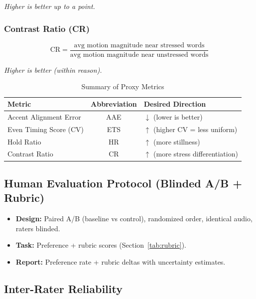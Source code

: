 \documentclass[11pt,a4paper]{article}
\begin{document}
\noindent\textit{Higher is better up to a point.}

\subsubsection{Contrast Ratio (CR)}

\begin{equation}
\text{CR} = \frac{\text{avg motion magnitude near stressed words}}{\text{avg motion magnitude near unstressed words}}
\label{eq:cr}
\end{equation}

\noindent\textit{Higher is better (within reason).}

\begin{table}[H]
\centering
\caption{Summary of Proxy Metrics}
\label{tab:metrics-summary}
\begin{tabular}{@{}lcl@{}}
\toprule
\textbf{Metric} & \textbf{Abbreviation} & \textbf{Desired Direction} \\
\midrule
Accent Alignment Error & AAE & $\downarrow$ (lower is better) \\
Even Timing Score (CV) & ETS & $\uparrow$ (higher CV = less uniform) \\
Hold Ratio & HR & $\uparrow$ (more stillness) \\
Contrast Ratio & CR & $\uparrow$ (more stress differentiation) \\
\bottomrule
\end{tabular}
\end{table}

\subsection{Human Evaluation Protocol (Blinded A/B + Rubric)}

\begin{itemize}[leftmargin=2em]
    \item \textbf{Design:} Paired A/B (baseline vs control), randomized order, identical audio, raters blinded.
    \item \textbf{Task:} Preference + rubric scores (Section~\ref{tab:rubric}).
    \item \textbf{Report:} Preference rate + rubric deltas with uncertainty estimates.
\end{itemize}

\subsection{Inter-Rater Reliability}
\end{document}
